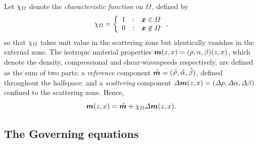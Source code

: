Let $\chi_{{\mit \Omega}}$ denote the {\em characteristic function } on ${{\mit \Omega}}$,
defined by 
\begin{equation}
\chi_{{\mit \Omega}}=
\left\{
\begin{array}{ccl} 1&:&{\mbox{\boldmath$\mit x$\unboldmath}}\in {\mit \Omega}\\ 0&:&{\mbox{\boldmath$\mit x$\unboldmath}}\not\in {\mit \Omega}
\end{array}  
\right. ,
\end{equation} 
so that $\chi_{{\mit \Omega}}$ takes unit value in the scattering zone
but identically vanishes in the external zone. The isotropic material properties ${\mbox{\boldmath$\mit m$\unboldmath}}(z,x)=(\rho,\alpha,\beta)(z,x)$, which denote the density, 
compressional and shear-wavespeeds respectively, are
defined as the sum of two parts: a {\em reference} component
${\stackrel{\scriptscriptstyle _{\,\,\circ}}{ \mbox{\boldmath$\mit m$\unboldmath}}}=({\stackrel{\scriptscriptstyle _{\,\,\circ}}{ \rho}},{\stackrel{\scriptscriptstyle _{\,\,\circ}}{ \alpha}},{\stackrel{\scriptscriptstyle _{\,\,\circ}}{ \beta}})$, 
defined throughout the halfspace; and a {\em scattering} component 
${\mit \Delta} {\mbox{\boldmath$\mit m$\unboldmath}}(z,x)=({\mit \Delta}{\rho},{\mit \Delta}{\alpha},{\mit \Delta}{\beta})$ 
confined to the  scattering zone. Hence,  
\begin{equation} \label{mdecomp}
{\mbox{\boldmath$\mit m$\unboldmath}}(z,x)=
{\stackrel{\scriptscriptstyle _{\,\,\circ}}{ \mbox{\boldmath$\mit m$\unboldmath}}}+\chi_{{\mit \Omega}} {\mit \Delta}{\mbox{\boldmath$\mit m$\unboldmath}}(z,x).
\end{equation}

\subsection{The Governing equations}


